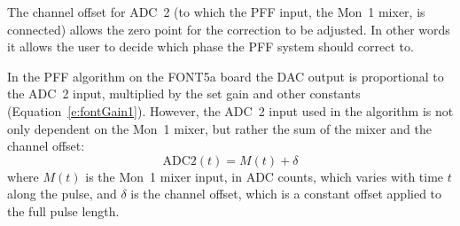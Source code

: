 The channel offset for ADC~2 (to which the PFF input, the Mon~1 mixer, is connected) allows the zero point for the correction to be adjusted. In other words it allows the user to decide which phase the PFF system should correct to. 

In the PFF algorithm on the FONT5a board the DAC output is proportional to the ADC~2 input, multiplied by the set gain and other constants (Equation~\ref{e:fontGain1}). However, the ADC~2 input used in the algorithm is not only dependent on the Mon~1 mixer, but rather the sum of the mixer and the channel offset: 
\begin{equation}
\mathrm{ADC2}(t) = M(t) + \delta
\label{e:chanOffset}
\end{equation}
where \(M(t)\) is the Mon~1 mixer input, in ADC counts, which varies with time \(t\) along the pulse, and \(\delta\) is the channel offset, which is a constant offset applied to the full pulse length.


